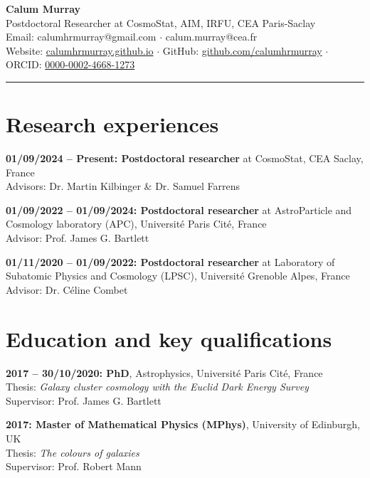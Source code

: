 \documentclass[11pt]{article}
\begin{document}
\begin{flushleft}
{\LARGE \textbf{Calum Murray}} \\[0.3em]
{\large Postdoctoral Researcher at CosmoStat, AIM, IRFU, CEA Paris-Saclay} \\[0.3em]
Email: calumhrmurray@gmail.com $\cdot$ calum.murray@cea.fr \\
Website: \href{https://calumhrmurray.github.io}{calumhrmurray.github.io} $\cdot$ GitHub: \href{https://github.com/calumhrmurray}{github.com/calumhrmurray} $\cdot$ ORCID: \href{https://orcid.org/0000-0002-4668-1273}{0000-0002-4668-1273}
\end{flushleft}

\vspace{0.5em}
{\color{sectioncolor}\rule{\linewidth}{1pt}}

\section*{Research experiences}

\textbf{01/09/2024 -- Present: Postdoctoral researcher} at CosmoStat, CEA Saclay, France \\
Advisors: Dr. Martin Kilbinger \& Dr. Samuel Farrens

\textbf{01/09/2022 -- 01/09/2024: Postdoctoral researcher} at AstroParticle and Cosmology laboratory (APC), Université Paris Cité, France \\
Advisor: Prof. James G. Bartlett

\textbf{01/11/2020 -- 01/09/2022: Postdoctoral researcher} at Laboratory of Subatomic Physics and Cosmology (LPSC), Université Grenoble Alpes, France \\
Advisor: Dr. Céline Combet

\section*{Education and key qualifications}

\textbf{2017 -- 30/10/2020: PhD}, Astrophysics, Université Paris Cité, France \\
Thesis: \textit{Galaxy cluster cosmology with the Euclid Dark Energy Survey} \\
Supervisor: Prof. James G. Bartlett

\textbf{2017: Master of Mathematical Physics (MPhys)}, University of Edinburgh, UK \\
Thesis: \textit{The colours of galaxies} \\
Supervisor: Prof. Robert Mann
\end{document}
